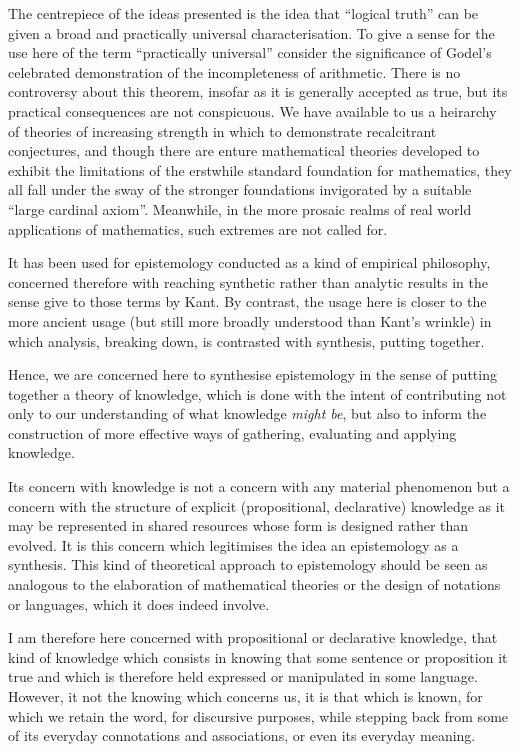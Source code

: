 \documentclass[10pt,titlepage]{book}
\begin{document}
The centrepiece of the ideas presented is the idea that ``logical truth'' can be given a broad and practically universal characterisation.
To give a sense for the use here of the term ``practically universal'' consider the significance of Godel's celebrated demonstration of the incompleteness of arithmetic.
There is no controversy about this theorem, insofar as it is generally accepted as true, but its practical consequences are not conspicuous.
We have available to us a heirarchy of theories of increasing strength in which to demonstrate recalcitrant conjectures, and though there are enture mathematical theories developed to exhibit the limitations of the erstwhile standard foundation for mathematics, they all fall under the sway of the stronger foundations invigorated by a suitable ``large cardinal axiom''.
Meanwhile, in the more prosaic realms of real world applications of mathematics, such extremes are not called for.


It has been used for epistemology conducted as a kind of empirical philosophy, concerned therefore with reaching synthetic rather than analytic results in the sense give to those terms by Kant.
By contrast, the usage here is closer to the more ancient usage (but still more broadly understood than Kant's wrinkle) in which analysis, breaking down, is contrasted with synthesis, putting together.

Hence, we are concerned here to synthesise epistemology in the sense of putting together a theory of knowledge, which is done with the intent of contributing not only to our understanding of what knowledge \emph{might be}, but also to inform the construction of more effective ways of gathering, evaluating and applying knowledge.



Its concern with knowledge is not a concern with any material phenomenon but a concern with the structure of explicit (propositional, declarative) knowledge as it may be represented in shared resources whose form is designed rather than evolved.
It is this concern which legitimises the idea an epistemology as a synthesis.
This kind of theoretical approach to epistemology should be seen as analogous to the elaboration of mathematical theories or the design of notations or languages, which it does indeed involve.

I am therefore here concerned with propositional or declarative knowledge, that kind of knowledge which consists in knowing that some sentence or proposition it true and which is therefore held expressed or manipulated in some language.
However, it not the knowing which concerns us, it is that which is known, for which we retain the word, for discursive purposes, while stepping back from some of its everyday connotations and associations, or even its everyday meaning.
\end{document}
